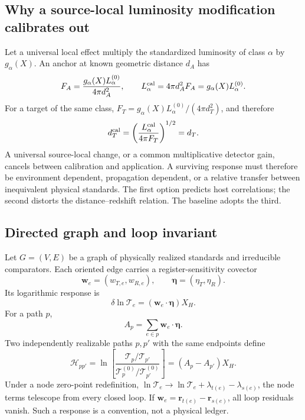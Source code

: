 \documentclass[aps,prd,twocolumn,10pt,superscriptaddress,nofootinbib]{revtex4-2}
\begin{document}
\subsection{Why a source-local luminosity modification calibrates out}

Let a universal local effect multiply the standardized luminosity of class
$\alpha$ by $g_\alpha(X)$.  An anchor at known geometric distance $d_A$
has
\begin{equation}
F_A=\frac{g_\alpha(X)L_\alpha^{(0)}}{4\pi d_A^2},
\qquad
L_\alpha^{\rm cal}=4\pi d_A^2F_A=g_\alpha(X)L_\alpha^{(0)}.
\end{equation}
For a target of the same class,
$F_T=g_\alpha(X)L_\alpha^{(0)}/(4\pi d_T^2)$, and therefore
\begin{equation}
d_T^{\rm cal}
=\left(\frac{L_\alpha^{\rm cal}}{4\pi F_T}\right)^{1/2}=d_T.
\label{eq:pb_source_cancel}
\end{equation}
A universal source-local change, or a common multiplicative detector gain,
cancels between calibration and application.  A surviving response must
therefore be environment dependent, propagation dependent, or a relative
transfer between inequivalent physical standards.  The first option predicts
host correlations; the second distorts the distance--redshift relation.  The
baseline adopts the third.

\subsection{Directed graph and loop invariant}

Let $G=(V,E)$ be a graph of physically realized standards and irreducible
comparators.  Each oriented edge carries a register-sensitivity covector
\begin{equation}
\mathbf w_e=(w_{T,e},w_{R,e}),
\qquad
\boldsymbol\eta=(\eta_T,\eta_R).
\label{eq:pb_edge_vectors}
\end{equation}
Its logarithmic response is
\begin{equation}
\delta\ln\mathcal T_e
=(\mathbf w_e\cdot\boldsymbol\eta)X_H.
\label{eq:pb_edge_response}
\end{equation}
For a path $p$,
\begin{equation}
A_p=\sum_{e\in p}\mathbf w_e\cdot\boldsymbol\eta.
\label{eq:pb_path_charge}
\end{equation}
Two independently realizable paths $p,p'$ with the same endpoints define
\begin{equation}
\boxed{
\mathcal H_{pp'}
=\ln\!\left[
\frac{\mathcal T_p/\mathcal T_{p'}}
{\mathcal T_p^{(0)}/\mathcal T_{p'}^{(0)}}
\right]
=(A_p-A_{p'})X_H.}
\label{eq:pb_loop_holonomy}
\end{equation}
Under a node zero-point redefinition,
$\ln\mathcal T_e\rightarrow\ln\mathcal T_e+
\lambda_{t(e)}-\lambda_{s(e)}$, the node terms telescope from every closed
loop.  If $\mathbf w_e=\mathbf r_{t(e)}-\mathbf r_{s(e)}$, all loop
residuals vanish.  Such a response is a convention, not a physical ledger.
\end{document}
